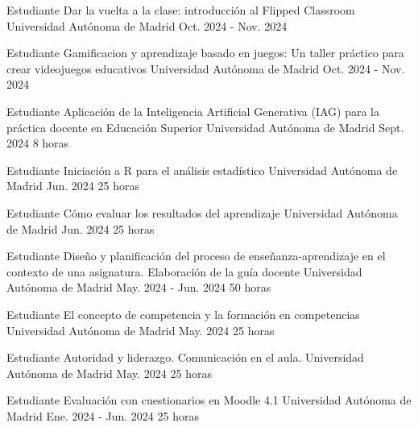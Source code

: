 \begin{cventries}

   \cventry
	{Estudiante} %
	{Dar la vuelta a la clase: introducción al Flipped Classroom} %
	{Universidad Autónoma de Madrid} %
	{Oct. 2024 - Nov. 2024} %
	{
	}

  \cventry
    {Estudiante} %
    {Gamificacion y aprendizaje basado en juegos: Un taller práctico para crear videojuegos educativos} %
    {Universidad Autónoma de Madrid} %
    {Oct. 2024 - Nov. 2024} %
    {
    }

  \cventry
	{Estudiante} %
	{Aplicación de la Inteligencia Artificial Generativa (IAG) para la práctica docente en Educación Superior} %
	{Universidad Autónoma de Madrid} %
	{Sept. 2024} %
	{8 horas}
	
	  \cventry
    {Estudiante} %
    {Iniciación a R para el análisis estadístico
} %
    {Universidad Autónoma de Madrid} %
    {Jun. 2024} %
    {25 horas}
    
	  \cventry
    {Estudiante} %
    {Cómo evaluar los resultados del aprendizaje} %
    {Universidad Autónoma de Madrid} %
    {Jun. 2024} %
    {25 horas}

	  \cventry
    {Estudiante} %
    {Diseño y planificación del proceso de enseñanza-aprendizaje en el contexto de una asignatura. Elaboración de la guía docente} %
    {Universidad Autónoma de Madrid} %
    {May. 2024 - Jun. 2024} %
    {50 horas}
    
	  \cventry
    {Estudiante} %
    {El concepto de competencia y la formación en competencias} %
    {Universidad Autónoma de Madrid} %
    {May. 2024} %
    {25 horas}

	  \cventry
    {Estudiante} %
    {Autoridad y liderazgo. Comunicación en el aula.} %
    {Universidad Autónoma de Madrid} %
    {May. 2024} %
    {25 horas}

  \cventry
    {Estudiante} %
    {Evaluación con cuestionarios en Moodle 4.1} %
    {Universidad Autónoma de Madrid} %
    {Ene. 2024 - Jun. 2024} %
    {25 horas
    }


\end{cventries}
